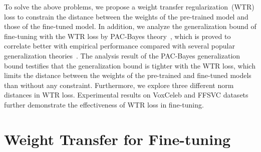 \documentclass{article}
\begin{document}
To solve the above problems, we propose a weight transfer regularization~(WTR) loss to constrain the distance between the weights of the pre-trained model and those of the fine-tuned model. In addition, we analyze the generalization bound of fine-tuning with the WTR loss by PAC-Bayes theory~\cite{shawe1997pac}, which is proved to correlate better with empirical performance compared with several popular generalization theories~\cite{jiang2019fantastic}. %
The analysis result of the PAC-Bayes generalization bound testifies that the generalization bound is tighter with the WTR loss, which limits the distance between the
weights of the pre-trained and fine-tuned models than without any constraint. Furthermore, we explore three different norm distances in WTR loss. Experimental results on VoxCeleb and FFSVC datasets further demonstrate the effectiveness of WTR loss in fine-tuning.
\iffalse
The generalization of neural networks can be measured by the PAC-Bayes
generalization bound~\citec{jiang2019fan tastic}. and overfitting. We demonstrate the PAC-Bayes
generalization bound with the constraint on the distance
between the weights of the pre-trained model and fine-tuned model have a tighter generalization bound than without any constraint. The tighter generalization bound indicates that the model has better generalization ability~\cite{jiang2019fantastic}. Meanwhile, we explore three different matrix norms of the distance between weights of pre-trained model and those of fine-tuned model. Experimental results demonstrate any matrix norm of distance effectively improve the performance of fine-tuned models and the super distance is frobenius norm of distances.
\fi
\iffalse
The rest is organized as follows. Section 2 introduces the proposed methods and Section 3 describes the experimental setup and results.
Section 4 concludes this paper. 
\fi
 
\section{Weight Transfer for Fine-tuning}
\end{document}
